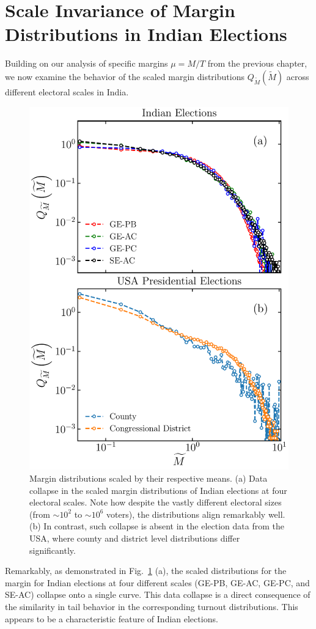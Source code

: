 \section{Scale Invariance of Margin Distributions in Indian Elections}
Building on our analysis of specific margins $\mu = M/T$ from the previous chapter, we now examine the behavior of the scaled margin distributions $Q_{\widetilde{M}}(\widetilde{M})$ across different electoral scales in India.
\begin{figure}[H]
    \centering
    \includegraphics[width=0.8\linewidth]{chapters/chapter6/scaled_margin_dist_India_us.pdf}
    \caption{Margin distributions scaled by their respective means. (a) Data collapse in the scaled margin distributions of Indian elections at four electoral scales. Note how despite the vastly different electoral sizes (from $\sim 10^2$ to $\sim 10^6$ voters), the distributions align remarkably well. (b) In contrast, such collapse is absent in the election data from the USA, where county and district level distributions differ significantly.}
    \label{fig:margin_dist_india_us}
\end{figure}

Remarkably, as demonstrated in Fig.~\ref{fig:margin_dist_india_us} (a), the scaled distributions for the margin for Indian elections at four different scales (GE-PB, GE-AC, GE-PC, and SE-AC) collapse onto a single curve. This data collapse is a direct consequence of the similarity in tail behavior in the corresponding turnout distributions. This appears to be a characteristic feature of Indian elections.

